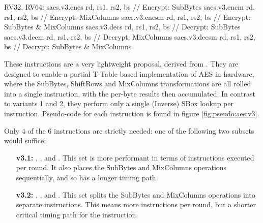 \begin{cryptoisa}
RV32, RV64:
    saes.v3.encs      rd, rs1, rs2, bs // Encrypt: SubBytes
    saes.v3.encm      rd, rs1, rs2, bs // Encrypt: MixColumns
    saes.v3.encsm     rd, rs1, rs2, bs // Encrypt: SubBytes & MixColumns
    saes.v3.decs      rd, rs1, rs2, bs // Decrypt: SubBytes
    saes.v3.decm      rd, rs1, rs2, bs // Decrypt: MixColumns
    saes.v3.decsm     rd, rs1, rs2, bs // Decrypt: SubBytes & MixColumns
\end{cryptoisa}

These instructions are a very lightweight proposal, derived from
\cite{MJS:20}.
They are designed to enable a partial T-Table based implementation
of AES in hardware, where the SubBytes, ShiftRows and MixColumns
transformations are all rolled into a single instruction, with the
per-byte results then accumulated.
In contrast to variants 1 and 2, they perform only a single (Inverse) SBox
lookup per instruction.
Pseudo-code for each instruction is found in figure
\ref{fig:pseudo:aes:v3}.

Only $4$ of the $6$ instructions are strictly needed: one of the following two
subsets would suffice:
\begin{enumerate}
\item[{\bf v3.1:}]  ,
                    ,
                     and
                    .
    This set is more performant in terms of instructions executed per
    round.
    It also places the SubBytes and MixColumns operations
    sequentially, and so has a longer timing path.
\item[{\bf v3.2:}]  ,
                    ,
                     and
                    .
    This set splits the SubBytes and MixColumns operations into separate
    instructions.
    This means more instructions per round, but a shorter critical
    timing path for the instruction.
\end{enumerate}

